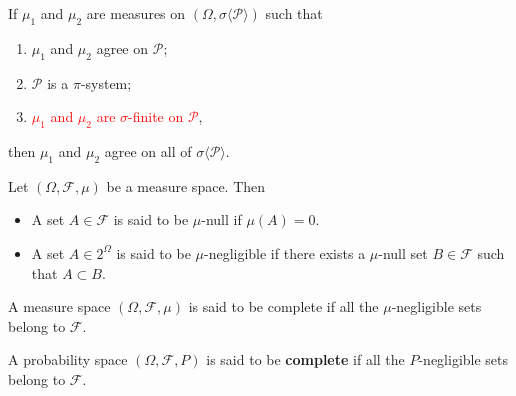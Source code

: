\begin{theorem}
\label{uui}
If $\mu_1$ and $\mu_2$ are measures on $(\Omega, \sigma\langle \mathcal P\rangle)$ such that
\begin{enumerate}
\item $\mu_1$ and $\mu_2$ agree on $\mathcal P$;
\item $\mathcal P$ is a $\pi$-system;
\item \textcolor{red}{$\mu_1$ and $\mu_2$ are $\sigma$-finite on $\mathcal P$},
\end{enumerate}
then $\mu_1$ and $\mu_2$ agree on all of $ \sigma\langle \mathcal P\rangle$.
\end{theorem}





\begin{definition}
Let $(\Omega,\mathcal F, \mu)$ be a measure space. Then
\begin{itemize}
\item
A set $A\in \mathcal F$ is said to be {$\mu$-null}  if $\mu(A)=0$.
\item
A set $A\in 2^\Omega$ is said to be {$\mu$-negligible} if there exists a $\mu$-null set  $B\in \mathcal F$ such that $A\subset B$.
\end{itemize}
\end{definition}





\begin{definition}[{\bf Complete}]
A measure space $(\Omega, \mathcal F, \mu)$ is said to be complete if all the $\mu$-negligible sets belong to $\mathcal F$.
\end{definition}



\begin{definition}[{\bf Complete}]
A probability space $(\Omega, \mathcal F, P)$ is said to be {\bf complete} if all the $P$-negligible sets belong to $\mathcal F$.
\end{definition}




